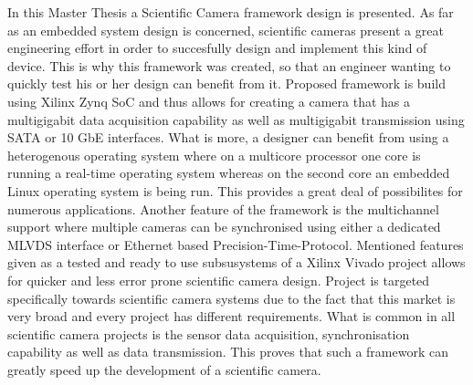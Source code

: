 % 
%



In this Master Thesis a Scientific Camera framework design is presented. As far as an embedded system design is
concerned, scientific cameras present a great engineering effort in order to succesfully design and implement this kind
of device. This is why this framework was created, so that an engineer wanting to quickly test his or her design can
benefit from it. Proposed framework is build using Xilinx Zynq SoC and thus allows for creating a camera that has 
a multigigabit data acquisition capability as well as multigigabit transmission using SATA or 10 GbE interfaces. 
What is more, a designer can benefit from using a heterogenous operating system where on a multicore processor 
one core is running a real-time operating system whereas on the second core an embedded Linux operating system is 
being run. This provides a great deal of possibilites for numerous applications. Another feature of the framework is 
the multichannel support where multiple cameras can be synchronised using either a dedicated MLVDS interface or 
Ethernet based Precision-Time-Protocol. Mentioned features given as a tested and ready to use subsusystems of a Xilinx 
Vivado project allows for quicker and less error prone scientific camera design. Project is targeted specifically 
towards scientific camera systems due to the fact that this market is very broad and every project has different
requirements. What is common in all scientific camera projects is the sensor data acquisition, synchronisation
capability as well as data transmission. This proves that such a framework can greatly speed up the development 
of a scientific camera. 
